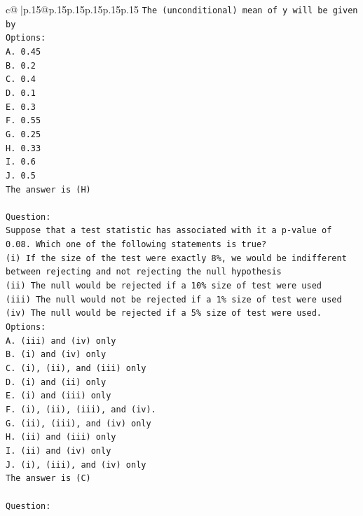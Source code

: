\documentclass{article}
\begin{document}
{\begin{supertabular}{c@{$\;$}|p{.15\linewidth}@{}p{.15\linewidth}p{.15\linewidth}p{.15\linewidth}p{.15\linewidth}p{.15\linewidth}}
{{{\texttt{The (unconditional) mean of y will be given by} \\
\texttt{Options:} \\
\texttt{A. 0.45} \\
\texttt{B. 0.2} \\
\texttt{C. 0.4} \\
\texttt{D. 0.1} \\
\texttt{E. 0.3} \\
\texttt{F. 0.55} \\
\texttt{G. 0.25} \\
\texttt{H. 0.33} \\
\texttt{I. 0.6} \\
\texttt{J. 0.5} \\
\texttt{The answer is (H)} \\
\\ 
\texttt{Question:} \\
\texttt{Suppose that a test statistic has associated with it a p{-}value of 0.08. Which one of the following statements is true?} \\
\texttt{(i) If the size of the test were exactly 8\%, we would be indifferent between rejecting and not rejecting the null hypothesis} \\
\texttt{(ii) The null would be rejected if a 10\% size of test were used} \\
\texttt{(iii) The null would not be rejected if a 1\% size of test were used} \\
\texttt{(iv) The null would be rejected if a 5\% size of test were used.} \\
\texttt{Options:} \\
\texttt{A. (iii) and (iv) only} \\
\texttt{B. (i) and (iv) only} \\
\texttt{C. (i), (ii), and (iii) only} \\
\texttt{D. (i) and (ii) only} \\
\texttt{E. (i) and (iii) only} \\
\texttt{F. (i), (ii), (iii), and (iv).} \\
\texttt{G. (ii), (iii), and (iv) only} \\
\texttt{H. (ii) and (iii) only} \\
\texttt{I. (ii) and (iv) only} \\
\texttt{J. (i), (iii), and (iv) only} \\
\texttt{The answer is (C)} \\
\\ 
\texttt{Question:} \\
}}}
\end{supertabular}}
\end{document}

